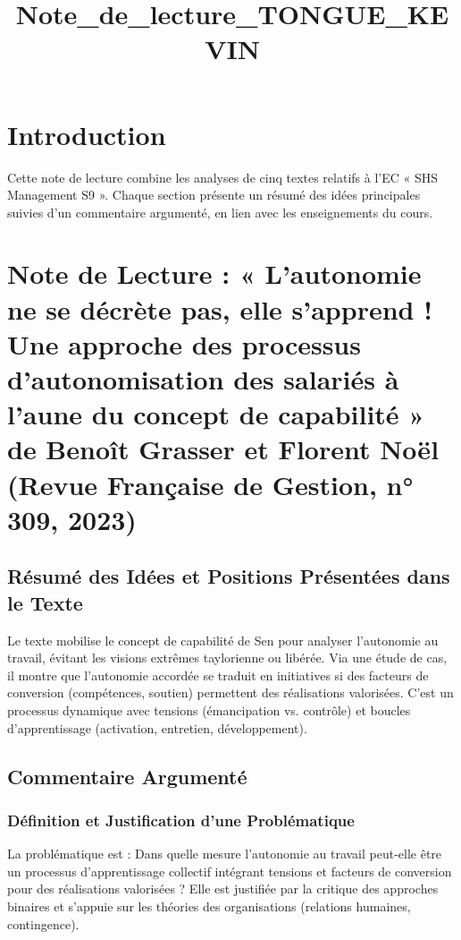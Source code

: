 \documentclass[11pt]{rapportECL}
\title{Note_de_lecture_TONGUE_KEVIN}
\begin{document}
\fairepagedegarde
\tabledematieres
\fontsize{11}{13}\selectfont

\section{Introduction}
Cette note de lecture combine les analyses de cinq textes relatifs à l'EC « SHS Management S9 ». Chaque section présente un résumé des idées principales suivies d'un commentaire argumenté, en lien avec les enseignements du cours.

\section{Note de Lecture : « L’autonomie ne se décrète pas, elle s’apprend ! Une approche des processus d’autonomisation des salariés à l’aune du concept de capabilité » de Benoît Grasser et Florent Noël (Revue Française de Gestion, n° 309, 2023)}

\subsection{Résumé des Idées et Positions Présentées dans le Texte}
Le texte mobilise le concept de capabilité de Sen pour analyser l’autonomie au travail, évitant les visions extrêmes taylorienne ou libérée. Via une étude de cas, il montre que l’autonomie accordée se traduit en initiatives si des facteurs de conversion (compétences, soutien) permettent des réalisations valorisées. C’est un processus dynamique avec tensions (émancipation vs. contrôle) et boucles d’apprentissage (activation, entretien, développement).

\subsection{Commentaire Argumenté}

\subsubsection{Définition et Justification d’une Problématique}
La problématique est : Dans quelle mesure l’autonomie au travail peut-elle être un processus d’apprentissage collectif intégrant tensions et facteurs de conversion pour des réalisations valorisées ? Elle est justifiée par la critique des approches binaires et s’appuie sur les théories des organisations (relations humaines, contingence).
\end{document}
